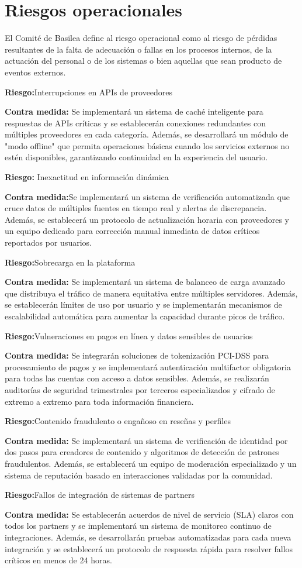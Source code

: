 \section{Riesgos operacionales}
El Comité de Basilea define al riesgo operacional como al riesgo de pérdidas resultantes de la falta de adecuación o fallas en los procesos internos, de la actuación del personal o de los sistemas o bien aquellas que sean producto de eventos externos.

\textbf{Riesgo:}Interrupciones en APIs de proveedores

\textbf{Contra medida:} Se implementará un sistema de caché inteligente para respuestas de APIs críticas y se establecerán conexiones redundantes con múltiples proveedores en cada categoría. Además, se desarrollará un módulo de "modo offline" que permita operaciones básicas cuando los servicios externos no estén disponibles, garantizando continuidad en la experiencia del usuario.

\textbf{Riesgo:} Inexactitud en información dinámica

\textbf{Contra medida:}Se implementará un sistema de verificación automatizada que cruce datos de múltiples fuentes en tiempo real y alertas de discrepancia. Además, se establecerá un protocolo de actualización horaria con proveedores y un equipo dedicado para corrección manual inmediata de datos críticos reportados por usuarios.

\textbf{Riesgo:}Sobrecarga en la plataforma

\textbf{Contra medida:} Se implementará un sistema de balanceo de carga avanzado que distribuya el tráfico de manera equitativa entre múltiples servidores. Además, se establecerán límites de uso por usuario y se implementarán mecanismos de escalabilidad automática para aumentar la capacidad durante picos de tráfico.

\textbf{Riesgo:}Vulneraciones en pagos en línea y datos sensibles de usuarios

\textbf{Contra medida:} Se integrarán soluciones de tokenización PCI-DSS para procesamiento de pagos y se implementará autenticación multifactor obligatoria para todas las cuentas con acceso a datos sensibles. Además, se realizarán auditorías de seguridad trimestrales por terceros especializados y cifrado de extremo a extremo para toda información financiera.

\textbf{Riesgo:}Contenido fraudulento o engañoso en reseñas y perfiles

\textbf{Contra medida:} Se implementará un sistema de verificación de identidad por dos pasos para creadores de contenido y algoritmos de detección de patrones fraudulentos. Además, se establecerá un equipo de moderación especializado y un sistema de reputación basado en interacciones validadas por la comunidad.

\textbf{Riesgo:}Fallos de integración de sistemas de partners

\textbf{Contra medida:} Se establecerán acuerdos de nivel de servicio (SLA) claros con todos los partners y se implementará un sistema de monitoreo continuo de integraciones. Además, se desarrollarán pruebas automatizadas para cada nueva integración y se establecerá un protocolo de respuesta rápida para resolver fallos críticos en menos de 24 horas.
